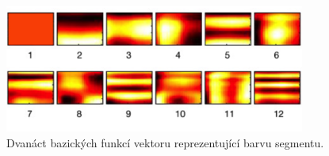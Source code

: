\documentclass[thesis=B, czech]{FITthesis}[2019/03/06]
\let\oldquote\quote
\let\endoldquote\endquote
\renewenvironment{quote}[2][]
  {\if\relax\detokenize{#1}\relax
     \def\quoteauthor{#2}%
   \else
     \def\quoteauthor{#2~---~#1}%
   \fi
   \oldquote}
  {\par\nobreak\smallskip\hfill(\quoteauthor)%
   \endoldquote\addvspace{\bigskipamount}}
\begin{document}


\begin{figure}[h]
  \captionsetup{justification=centering}
  \centering
  \includegraphics[width=280pt]{images/Timbre_basis_functions.png}
  \caption[Dvanáct bazických funkcí vektoru reprezentující barvu segmentu.]{Dvanáct bazických funkcí vektoru reprezentující barvu segmentu.}
  \label{fig:timbre_spotify}
\end{figure}



\end{document}
